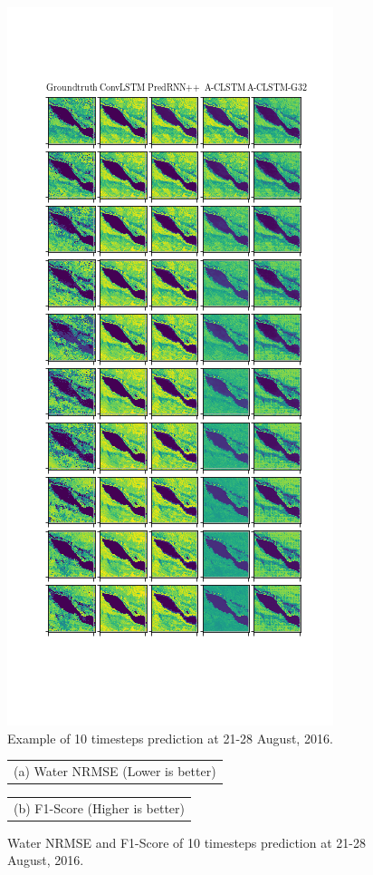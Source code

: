 \begin{figure}
    \includegraphics[width=.7\linewidth]{figures/chap4/10/30/groundtruth-predict-imgs.png}
    \caption{Example of 10 timesteps prediction at 21-28 August, 2016.}
    \label{fig:chap4-test-30-1}
\end{figure}

\begin{figure}
    \begin{center}
        \begin{tabular}[b]{c}
             \\
            \small (a) Water NRMSE (Lower is better)
        \end{tabular}
        \begin{tabular}[b]{c}
             \\
            \small (b) F1-Score (Higher is better)
        \end{tabular}
    \end{center}
    \caption{Water NRMSE and F1-Score of 10 timesteps prediction at 21-28 August, 2016.}
    \label{fig:chap4-test-30-2}
\end{figure}

